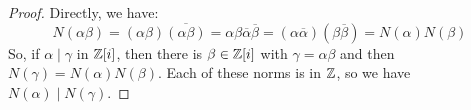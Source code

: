 \begin{proof}
    Directly, we have:
    \[ N(\alpha\beta) = (\alpha\beta)\overline{(\alpha\beta)} = \alpha\beta\overline{\alpha}\overline{\beta} = (\alpha\overline{\alpha})(\beta\overline{\beta}) = N(\alpha)N(\beta) \]
    So, if $\alpha \mid \gamma$ in $\mathbb{Z}[i]$, then there is $\beta \in \mathbb{Z}[i]$ with $\gamma = \alpha\beta$ and then $N(\gamma) = N(\alpha)N(\beta)$. Each of these norms is in $\mathbb{Z}$, so we have $N(\alpha) \mid N(\gamma)$.
\end{proof}